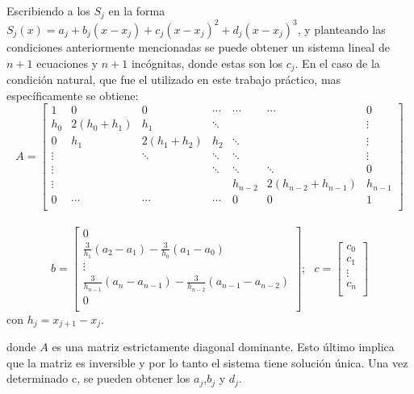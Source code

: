 \documentclass[a4paper]{article}
\begin{document}
Escribiendo a los $ S_j $ en la forma $S_j(x) = a_j + b_j(x-x_j)+c_j(x-x_j)^2+d_j(x-x_j)^3$, y planteando las condiciones anteriormente mencionadas se puede obtener un sistema lineal de $ n+1 $ ecuaciones y $ n+1 $ incógnitas, donde estas son los $ c_{j} $. En el caso de la condición natural, que fue el utilizado en este trabajo práctico, mas específicamente se obtiene:
$$
A =
\begin{bmatrix}
    1      & 0                  & 0      & \cdots & \cdots  & \cdots             & 0      \\
    h_0    & 2(h_0+h_1)         & h_1    & \ddots &         &                    & \vdots \\
    0      & h_1 & 2(h_1 + h_2) & h_2    & \ddots &         &                     \vdots \\
    \vdots &                    & \ddots & \ddots & \ddots  &                    & \vdots \\
    \vdots &                    &        & \ddots & \ddots  & \ddots             & 0      \\
    \vdots &                    &        &        & h_{n-2} & 2(h_{n-2}+h_{n-1}) & h_{n-1} \\
    0      & \cdots             & \cdots & \cdots & 0       & 0                  & 1 \\
\end{bmatrix}
$$ \\
$$
b=
\begin{bmatrix}
0 \\
\frac{3}{h_1}(a_2-a_1)-\frac{3}{h_0}(a_1-a_0) \\
\vdots \\
\frac{3}{h_{n-1}}(a_n-a_{n-1})-\frac{3}{h_{n-2}}(a_{n-1}-a_{n-2}) \\
0 \\
\end{bmatrix}
;  \  \ \ 
c=
\begin{bmatrix}
c_0\\
c_1\\
\vdots \\
c_n\\
\end{bmatrix}
$$
con $h_j=x_{j+1}-x_j$.

donde $ A $ es una matriz estrictamente diagonal dominante. Esto último implica que la matriz es inversible y por lo tanto el sistema tiene solución única. Una vez determinado c, se pueden obtener los $ a_{j}$,$ b_{j} $ y $d_{j}$.
\end{document}
